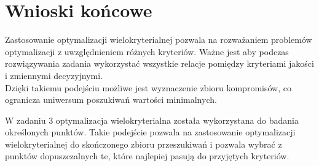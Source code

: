 \documentclass[a4paper,15pt]{article}
\begin{document}
\section{Wnioski końcowe}
Zastosowanie optymalizacji wielokryterialnej pozwala na rozważaniem problemów optymalizacji z uwzględnieniem różnych kryteriów. Ważne jest aby podczas rozwiązywania zadania wykorzystać wszystkie relacje pomiędzy kryteriami jakości i zmiennymi decyzyjnymi. \\
Dzięki takiemu podejściu możliwe jest wyznaczenie zbioru kompromisów, co ogranicza uniwersum poszukiwań wartości minimalnych. 

W zadaniu 3 optymalizacja wielokryterialna została wykorzystana do badania określonych punktów. Takie podejście pozwala na zastosowanie optymalizacji wielokryterialnej do skończonego zbioru przeszukiwań i pozwala wybrać z punktów dopuszczalnych te, które najlepiej pasują do przyjętych kryteriów. 
\end{document}
